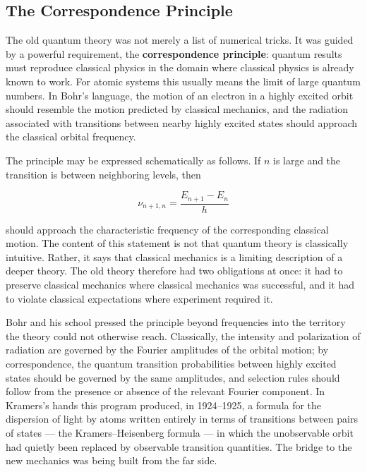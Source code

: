 \subsection{The Correspondence Principle}
The old quantum theory was not merely a list of numerical tricks. It was guided by a powerful requirement, the \textbf{correspondence principle}: quantum results must reproduce classical physics in the domain where classical physics is already known to work. For atomic systems this usually means the limit of large quantum numbers. In Bohr's language, the motion of an electron in a highly excited orbit should resemble the motion predicted by classical mechanics, and the radiation associated with transitions between nearby highly excited states should approach the classical orbital frequency.

The principle may be expressed schematically as follows. If $n$ is large and the transition is between neighboring levels, then
\begin{linenomath}
    \begin{equation}
        \nu_{n+1,n}=\frac{E_{n+1}-E_n}{h}
    \end{equation}
\end{linenomath}
should approach the characteristic frequency of the corresponding classical motion. The content of this statement is not that quantum theory is classically intuitive. Rather, it says that classical mechanics is a limiting description of a deeper theory. The old theory therefore had two obligations at once: it had to preserve classical mechanics where classical mechanics was successful, and it had to violate classical expectations where experiment required it.

Bohr and his school pressed the principle beyond frequencies into the territory the theory could not otherwise reach. Classically, the intensity and polarization of radiation are governed by the Fourier amplitudes of the orbital motion; by correspondence, the quantum transition probabilities between highly excited states should be governed by the same amplitudes, and selection rules should follow from the presence or absence of the relevant Fourier component. In Kramers's hands this program produced, in 1924--1925, a formula for the dispersion of light by atoms written entirely in terms of transitions between pairs of states --- the Kramers--Heisenberg formula --- in which the unobservable orbit had quietly been replaced by observable transition quantities. The bridge to the new mechanics was being built from the far side.

